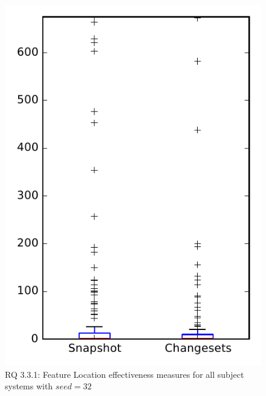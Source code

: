 
\begin{figure}
\centering
\includegraphics[height=0.4\textheight]{figures/flt_seed/rq1_overview_32}
\caption{RQ 3.3.1: Feature Location effectiveness measures for all subject systems with $seed=32$}
\label{fig:flt_seed:rq1:overview}
\end{figure}
